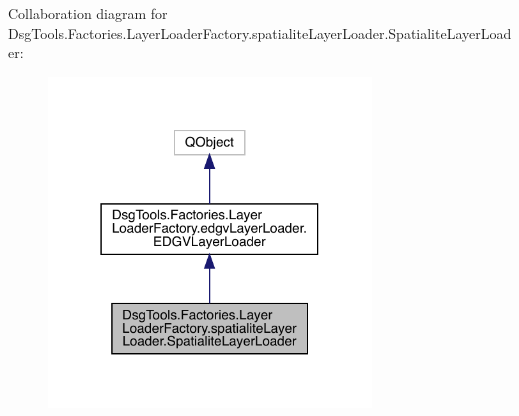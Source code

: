 Collaboration diagram for Dsg\+Tools.\+Factories.\+Layer\+Loader\+Factory.\+spatialite\+Layer\+Loader.\+Spatialite\+Layer\+Loader\+:
\nopagebreak
\begin{figure}[H]
\begin{center}
\leavevmode
\includegraphics[width=243pt]{class_dsg_tools_1_1_factories_1_1_layer_loader_factory_1_1spatialite_layer_loader_1_1_spatialite_layer_loader__coll__graph}
\end{center}
\end{figure}

